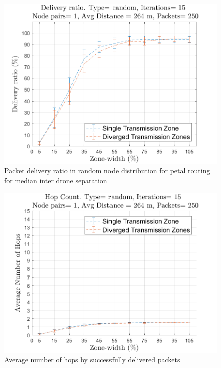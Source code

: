 \begin{figure}
\centering
\includegraphics[width=1\textwidth]{ncsuthesis-0.6/Appendix-A/figs/median_pe_DR_random.png}
\caption{Packet delivery ratio in random node distribution for petal routing for median inter drone separation}
\label{fig:med_pe_dr}
\end{figure}

\begin{figure}
\centering
\includegraphics[width=1\textwidth]{ncsuthesis-0.6/Appendix-A/figs/median_pe_hops_random.png}
\caption{Average number of hops by successfully delivered packets}
\label{fig:med_pe_hops}
\end{figure}


